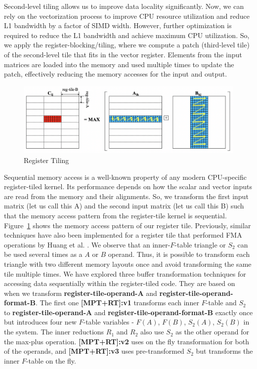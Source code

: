 
Second-level tiling allows us to improve data locality significantly. Now, we can rely on the vectorization process to improve CPU resource utilization and reduce L1 bandwidth by a factor of SIMD width. However, further optimization is required to reduce the L1 bandwidth and achieve maximum CPU utilization. So, we apply the register-blocking/tiling, where we compute a patch (third-level tile) of the second-level tile that fits in the vector register. Elements from the input matrices are loaded into the memory and used multiple times to update the patch, effectively reducing the memory accesses for the input and output.

\begin{figure}[htbp]
\centerline{\includegraphics[scale=0.25, trim=5 5 5 5,clip]{content/figures/register_tile.png}}
\caption{Register Tiling}
\label{fig:regiser_tile}
\end{figure}

Sequential memory access is a well-known property of any modern CPU-specific register-tiled kernel. Its performance depends on how the scalar and vector inputs are read from the memory and their alignments. So, we transform the first input matrix (let us call this A) and the second input matrix (let us call this B) such that the memory access pattern from the register-tile kernel is sequential. Figure~\ref{fig:regiser_tile} shows the memory access pattern of our register tile. Previously, similar techniques have also been implemented for a register tile that performed FMA operations by Huang et al. \cite{FLAWN80}. We observe that an inner-$F$-table triangle or $S_{2}$ can be used several times as a $A$ or $B$ operand. Thus, it is possible to transform each triangle with two different memory layouts once and avoid transforming the same tile multiple times. 
We have explored three buffer transformation techniques for accessing data sequentially within the register-tiled code. They are based on when we transform \textbf{register-tile-operand-A} and \textbf{register-tile-operand-format-B}. The first one \textbf{ [MPT+RT]:v1} transforms each inner $F$-table and $S_{2}$ to \textbf{register-tile-operand-A} and \textbf{register-tile-operand-format-B} exactly once but  introduces four new $F$-table variables - $F(A)$,  $F(B)$, $S_{2}(A)$, $S_{2}(B)$ in the system. The inner reductions $R_{1}$ and $R_{2}$ also use $S_{2}$ as the other operand for the max-plus operation. \textbf{ [MPT+RT]:v2} uses on the fly transformation for both of the operands, and \textbf{[MPT+RT]:v3} uses pre-transformed $S_{2}$ but transforms the inner $F$-table on the fly. 




